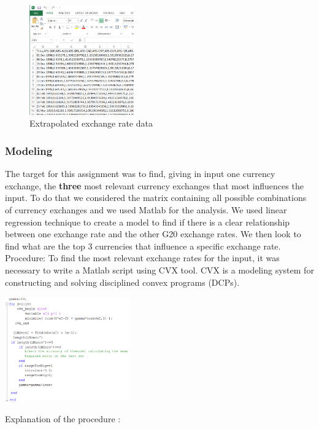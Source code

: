 \begin{figure}[!h]
	\begin{center}
		\includegraphics[width=0.4\textwidth]{bbb.png}
		\caption{Extrapolated exchange rate data}
		\label{extrap_ex_data}
	\end{center}
\end{figure}

\subsubsection{Modeling}
The target for this assignment was to find, giving in input one currency exchange, the \textbf{three} most relevant currency exchanges that most influences the input. To do that we considered the matrix containing all possible combinations of currency exchanges and we used Matlab for the analysis. We used linear regression technique to create a model to find if there is a clear relationship between one exchange rate and the other G20 exchange rates. We then look to find what are the top 3 currencies that influence a specific exchange rate.
\newline
Procedure:
To find the most relevant exchange rates for the input, it was necessary to write a Matlab script using CVX tool. CVX is a modeling system for constructing and solving disciplined convex programs (DCPs)\cite{leung2000forecasting}. 

\includegraphics[width=0.4\textwidth]{ccc.png}

Explanation of the procedure : 

